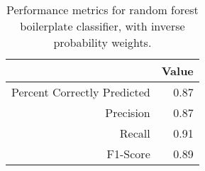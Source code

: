 \begin{table}[ht]
\centering
\begin{tabular}{rr}
  \hline
 & Value \\ 
  \hline
Percent Correctly Predicted & 0.87 \\ 
  Precision & 0.87 \\ 
  Recall & 0.91 \\ 
  F1-Score & 0.89 \\ 
   \hline
\end{tabular}
\caption{Performance metrics for random forest boilerplate classifier, with inverse probability weights.} 
\label{randomForest}
\end{table}

